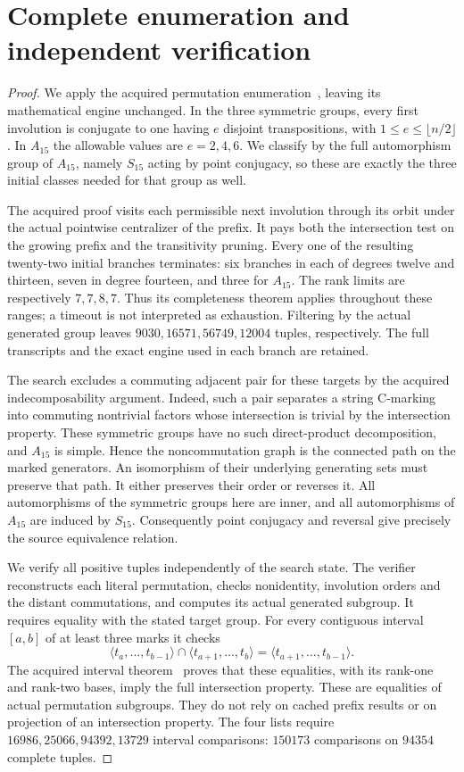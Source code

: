 \documentclass[10pt,a4paper]{article}
\begin{document}
\section*{Complete enumeration and independent verification}
\begin{proof}
We apply the acquired permutation enumeration~\cite{method}, leaving its
mathematical engine unchanged. In the three symmetric groups, every first
involution is conjugate to one having $e$ disjoint transpositions, with
$1\le e\le\lfloor n/2\rfloor$. In $A_{15}$ the allowable values are
$e=2,4,6$. We classify by the full automorphism group of $A_{15}$, namely
$S_{15}$ acting by point conjugacy, so these are exactly the three initial
classes needed for that group as well.

The acquired proof visits each permissible next involution through its
orbit under the actual pointwise centralizer of the prefix. It pays both
the intersection test on the growing prefix and the transitivity pruning.
Every one of the resulting twenty-two initial branches terminates:
six branches in each of degrees twelve and thirteen, seven in degree
fourteen, and three for $A_{15}$. The rank limits are respectively
$7,7,8,7$. Thus its completeness theorem applies throughout these ranges;
a timeout is not interpreted as exhaustion. Filtering by the actual
generated group leaves $9030,16571,56749,12004$ tuples, respectively.
The full transcripts and the exact engine used in each branch are retained.

The search excludes a commuting adjacent pair for these targets by the
acquired indecomposability argument. Indeed, such a pair separates a
string C-marking into commuting nontrivial factors whose intersection is
trivial by the intersection property. These symmetric groups have no such
direct-product decomposition, and $A_{15}$ is simple. Hence the
noncommutation graph is the connected path on the marked generators.
An isomorphism of their underlying generating sets must preserve that
path. It either preserves their order or reverses it. All automorphisms
of the symmetric groups here are inner, and all automorphisms of
$A_{15}$ are induced by $S_{15}$. Consequently point conjugacy and
reversal give precisely the source equivalence relation.

We verify all positive tuples independently of the search state. The
verifier reconstructs each literal permutation, checks nonidentity,
involution orders and the distant commutations, and computes its actual
generated subgroup. It requires equality with the stated target group.
For every contiguous interval $[a,b]$ of at least three marks it checks
\[
 \langle t_a,\ldots,t_{b-1}\rangle\cap
 \langle t_{a+1},\ldots,t_b\rangle
 =\langle t_{a+1},\ldots,t_{b-1}\rangle.
\]
The acquired interval theorem~\cite{intervals} proves that these equalities,
with its rank-one and rank-two bases, imply the full intersection property.
These are equalities of actual permutation subgroups. They do not rely on
cached prefix results or on projection of an intersection property.
The four lists require $16986,25066,94392,13729$ interval comparisons:
$150173$ comparisons on $94354$ complete tuples.


\end{proof}
\end{document}
